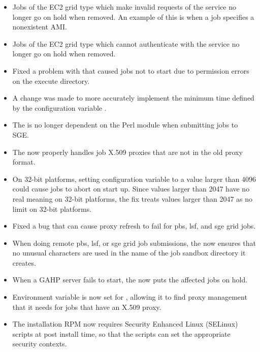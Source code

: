 \begin{itemize}

\item Jobs of the EC2 grid type which make invalid requests of the
service no longer go on hold when removed.
An example of this is when a job specifies a nonexistent AMI. 

\item Jobs of the EC2 grid type which cannot authenticate with the
service no longer go on hold when removed.

\item Fixed a problem with  that caused jobs not to start 
due to permission errors on the execute directory.

\item A change was made to more accurately implement the
minimum time defined by the configuration variable
. 

\item The  is no longer dependent on the Perl module 
 when submitting jobs to SGE.

\item The  now properly handles job X.509 proxies that 
are not in the old proxy format.

\item On 32-bit platforms,
setting configuration variable  to a value 
larger than 4096 could cause jobs to abort on start up.
Since values larger than 2047 have no real meaning on 32-bit platforms,
the fix treats values larger than 2047 as no limit on 32-bit platforms.

\item Fixed a bug that can cause proxy refresh to fail for pbs, lsf,
and sge grid jobs.

\item When doing remote pbs, lsf, or sge grid job submissions, the
 now ensures that no unusual characters are used in
the name of the job sandbox directory it creates.

\item When a GAHP server fails to start, the  now
puts the affected jobs on hold.

\item Environment variable  is now set for
,
allowing it to find proxy management that it needs for jobs that have an
X.509 proxy.

\item The installation RPM now requires Security Enhanced Linux (SELinux) 
scripts at post install time,
so that the scripts can set the appropriate security contexts.

\end{itemize}

